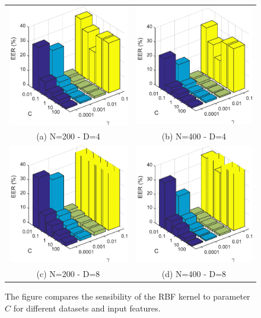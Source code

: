 \documentclass{ipol}
\begin{document}
\begin{figure}[!htbp]
	\begin{center}
		\begin{tabular}{cc}
			\includegraphics[width=.35\linewidth]{rbf_n200_d4.pdf} &
			\includegraphics[width=.35\linewidth]{rbf_n400_d4.pdf} \\
			(a) N=200 - D=4 & (b) N=400 - D=4 \\
			\includegraphics[width=.35\linewidth]{rbf_n200_d8.pdf} &
			\includegraphics[width=.35\linewidth]{rbf_n400_d8.pdf} \\
			(c) N=200 - D=8 & (d) N=400 - D=8 \\
		\end{tabular}
		\caption{The figure compares the sensibility of the RBF kernel to parameter $C$ for different datasets and input features.}
				\label{fig:rbfRes}
	\end{center}
\end{figure}
\end{document}
